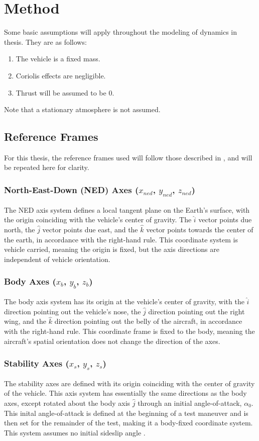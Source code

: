\chapter{Method}

\label{background-information}
Some basic assumptions will apply throughout the modeling of dynamics in thesis. They are as follows:
\begin{enumerate}
\item The vehicle is a fixed mass.
\item Coriolis effects are negligible.
\item Thrust will be assumed to be 0.
\end{enumerate}
Note that a stationary atmosphere is not assumed.

\section{Reference Frames}
For this thesis, the reference frames used will follow those described in \cite{klein2006aircraft}, and will be repeated here for clarity.

\subsection*{North-East-Down (NED) Axes ($x_{ned}$, $y_{ned}$, $z_{ned}$)}
The NED axis system defines a local tangent plane on the Earth's surface, with the origin coinciding with the vehicle's center of gravity. The $\hat{i}$ vector points due north, the $\hat{j}$ vector points due east, and the $\hat{k}$ vector points towards the center of the earth, in accordance with the right-hand rule. This coordinate system is vehicle carried, meaning the origin is fixed, but the axis directions are independent of vehicle orientation.

\subsection*{Body Axes ($x_b$, $y_b$, $z_b$)}
The body axis system has its origin at the vehicle's center of gravity, with the $\hat{i}$ direction pointing out the vehicle's nose, the $\hat{j}$ direction pointing out the right wing, and the $\hat{k}$ direction pointing out the belly of the aircraft, in accordance with the right-hand rule. This coordinate frame is fixed to the body, meaning the aircraft's spatial orientation does not change the direction of the axes.

\subsection*{Stability Axes ($x_s$, $y_s$, $z_s$)}
The stability axes are defined with its origin coinciding with the center of gravity of the vehicle. This axis system has essentially the same directions as the body axes, except rotated about the body axis $\hat{j}$ through an initial angle-of-attack, $\alpha_{0}$. This inital angle-of-attack is defined at the beginning of a test maneuver and is then set for the remainder of the test, making it a body-fixed coordinate system. This system assumes no initial sideslip angle \cite{roskam2001airplane}.

